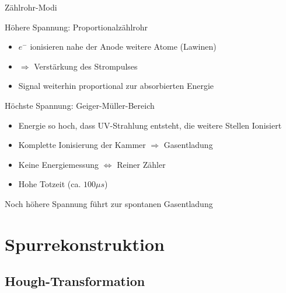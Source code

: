 \documentclass{beamer}
\begin{document}
\begin{frame}{Zählrohr-Modi}
	\begin{block}{Höhere Spannung: Proportionalzählrohr}
		\begin{itemize}
		  	\item $e^-$ ionisieren nahe der Anode weitere Atome (Lawinen)
			\item $\Rightarrow$ Verstärkung des Strompulses
		  	\item Signal weiterhin proportional zur absorbierten Energie
		\end{itemize}
	\end{block}
	
	\begin{block}{Höchste Spannung: Geiger-Müller-Bereich}
		\begin{itemize}
	  		\item Energie so hoch, dass UV-Strahlung entsteht, die weitere Stellen
	  		Ionisiert
	  		\item Komplette Ionisierung der Kammer $\Rightarrow$ Gasentladung
	  		\item Keine Energiemessung $\Leftrightarrow$ Reiner Zähler
	  		\item Hohe Totzeit (ca. $100\mu s$)
		\end{itemize}
	\end{block}
	Noch höhere Spannung führt zur spontanen Gasentladung
\end{frame}



\section{Spurrekonstruktion}


\subsection{Hough-Transformation}


\end{document}
